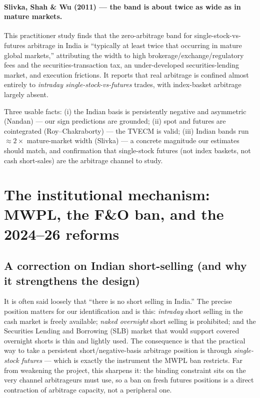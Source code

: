 \paragraph{Slivka, Shah \& Wu (2011) --- the band is about twice as wide as in mature markets.} This practitioner study finds that the zero-arbitrage band for single-stock-vs-futures arbitrage in India is ``typically at least twice that occurring in mature global markets,'' attributing the width to high brokerage/exchange/regulatory fees and the securities-transaction tax, an under-developed securities-lending market, and execution frictions. It reports that real arbitrage is confined almost entirely to \emph{intraday single-stock-vs-futures} trades, with index-basket arbitrage largely absent.

\begin{takeaway}
Three usable facts: (i) the Indian basis is persistently negative and asymmetric (Nandan) --- our sign predictions are grounded; (ii) spot and futures are cointegrated (Roy--Chakraborty) --- the TVECM is valid; (iii) Indian bands run $\approx 2\times$ mature-market width (Slivka) --- a concrete magnitude our estimates should match, and confirmation that single-stock futures (not index baskets, not cash short-sales) are the arbitrage channel to study.
\end{takeaway}

\section{The institutional mechanism: MWPL, the F\&O ban, and the 2024--26 reforms}
\label{sec:institution}

\subsection*{A correction on Indian short-selling (and why it strengthens the design)}
It is often said loosely that ``there is no short selling in India.'' The precise position matters for our identification and is this: \emph{intraday} short selling in the cash market is freely available; \emph{naked overnight} short selling is prohibited; and the Securities Lending and Borrowing (SLB) market that would support covered overnight shorts is thin and lightly used. The consequence is that the practical way to take a persistent short/negative-basis arbitrage position is through \emph{single-stock futures} --- which is exactly the instrument the MWPL ban restricts. Far from weakening the project, this sharpens it: the binding constraint sits on the very channel arbitrageurs must use, so a ban on fresh futures positions is a direct contraction of arbitrage capacity, not a peripheral one.

